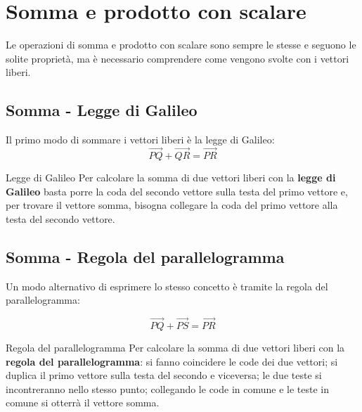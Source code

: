 \section{Somma e prodotto con scalare}
Le operazioni di somma e prodotto con scalare sono sempre le stesse e seguono le solite proprietà, ma è necessario comprendere come vengono svolte con i vettori liberi.
\subsection{Somma - Legge di Galileo}
Il primo modo di sommare i vettori liberi è la legge di Galileo:
\[
    \vec{PQ} + \vec{QR} = \vec{PR}
\]
\begin{center}
    \tikzset{external/export = true}
    \tikzset{external/export = false}
\end{center}
\begin{teo}{Legge di Galileo}
    Per calcolare la somma di due vettori liberi con la \textbf{legge di Galileo} basta porre la coda del secondo vettore sulla testa del primo vettore e, per trovare il vettore somma, bisogna collegare la coda del primo vettore alla testa del secondo vettore.
\end{teo}

\subsection{Somma - Regola del parallelogramma}
Un modo alternativo di esprimere lo stesso concetto è tramite la regola del parallelogramma:
\begin{center}
    \tikzset{external/export = true}
    \tikzset{external/export = true}
\end{center}
\[
    \vec{PQ} + \vec{PS} = \vec{PR}
\]
\begin{teo}{Regola del parallelogramma}
    Per calcolare la somma di due vettori liberi con la \textbf{regola del parallelogramma}: si fanno coincidere le code dei due vettori; si duplica il primo vettore sulla testa del secondo e viceversa; le due teste si incontreranno nello stesso punto; collegando le code in comune e le teste in comune si otterrà il vettore somma.
\end{teo}

